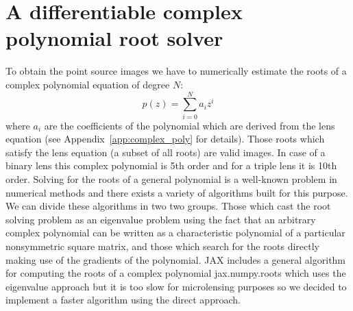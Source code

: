 \documentclass[12pt,dvipsnames]{report}
\newcommand{\ssf}[1]{\textsf{#1}}
\begin{document}
\section{A differentiable complex polynomial root solver}
\label{sec:root_solver}
To obtain the point
source images we have to numerically estimate the roots of a complex polynomial 
equation of degree $N$:
\begin{equation}
    p(z)=\sum_{i=0}^{N} a_i z^i
    \label{eq:general_complex_poly}
\end{equation}
where $a_i$ are the coefficients of the polynomial which are derived from the lens equation
(see Appendix~\ref{app:complex_poly} for details). Those roots which satisfy the lens 
equation (a subset of all roots) are valid images.
In case of a binary lens this complex polynomial is 5th order  and for a triple lens it is 10th 
order. Solving for the roots of a general polynomial is a well-known problem in numerical methods 
and there exists a variety of algorithms built for this purpose.
We can divide these algorithms in two two groups. 
Those which cast the root solving problem as an eigenvalue problem using the fact that 
an arbitrary complex polynomial can be written as a characteristic polynomial of a 
particular nonsymmetric square matrix, and those which search for the roots directly making 
use of the gradients of the polynomial. \ssf{JAX} includes a general algorithm for computing
the roots of a complex polynomial \ssf{jax.numpy.roots} which uses the eigenvalue 
approach but it is too slow for microlensing purposes so we decided to implement a faster
algorithm using the direct approach.
\end{document}
